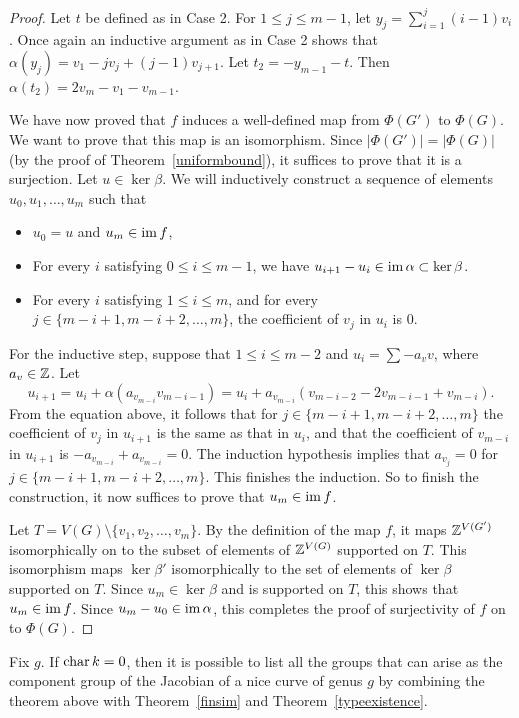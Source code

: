 \begin{proof}
Let $t$ be defined as in Case 2. For $1 \leq j \leq m-1$, let $y_j = \sum_{i=1}^j (i-1)v_i$. Once again an inductive argument as in Case 2 shows that $\alpha(y_j) = v_1-jv_j+(j-1)v_{j+1}$. Let $t_2 = -y_{m-1}-t$. Then $\alpha(t_2) = 2v_m-v_1-v_{m-1}$.

We have now proved that $f$ induces a well-defined map from $\Phi(G')$ to $\Phi(G)$. We want to prove that this map is an isomorphism. Since $|\Phi(G')| = |\Phi(G)|$ (by the proof of Theorem~\ref{uniformbound}), it suffices to prove that it is a surjection. Let $u \in \ker \beta$. We will inductively construct a sequence of elements $u_0,u_1,\ldots,u_m$ such that 
 \begin{itemize}
  \item $u_0 = u$ and $u_m \in \operatorname{im} f$,
  \item For every $i$ satisfying $0 \leq i \leq m-1$, we have $u_{i+1}-u_i \in \operatorname{im} \alpha \subset \ker \beta$. 
  \item For every $i$ satisfying $1 \leq i \leq m$, and for every $j \in \{{m-i+1},{m-i+2},\ldots,m\}$, the coefficient of $v_j$ in $u_i$ is $0$.  
 \end{itemize}
 For the inductive step, suppose that $1 \leq i \leq m-2$ and $u_i = \sum -a_v v$, where $a_v \in \mathbb Z$. Let 
 \[ u_{i+1} = u_i + \alpha(a_{v_{m-i}} v_{m-i-1}) = u_i+a_{v_{m-i}}(v_{m-i-2}-2v_{m-i-1}+v_{m-i}) .\] 
 From the equation above, it follows that for $j \in \{m-i+1,m-i+2,\ldots,m \}$ the coefficient of $v_j$ in $u_{i+1}$ is the same as that in $u_i$, and that the coefficient of $v_{m-i}$ in $u_{i+1}$ is $-a_{v_{m-i}}+a_{v_{m-i}} = 0$. The induction hypothesis implies that $a_{v_j} = 0$ for $j \in \{m-i+1,m-i+2,\ldots,m\}$. This finishes the induction. So to finish the construction, it now suffices to prove that $u_m \in \operatorname{im} f$. 
 
 Let $T = V(G) \setminus \{v_1,v_2,\ldots,v_m\}$. By the definition of the map $f$, it maps $\mathbb Z^{V(G')}$ isomorphically on to the subset of elements of $\mathbb Z^{V(G)}$ supported on $T$. This isomorphism maps $\ker \beta'$ isomorphically to the set of elements of $\ker \beta$ supported on $T$. Since $u_m \in \ker \beta$ and is supported on $T$, this shows that $u_m \in \operatorname{im} f$.  Since $u_m-u_0 \in \operatorname{im} \alpha$, this completes the proof of surjectivity of $f$ on to $\Phi(G)$.   
\end{proof}

\begin{rmk}
 Fix $g$. If $\operatorname{char} k = 0$, then it is possible to list all the groups that can arise as the component group of the Jacobian of a nice curve of genus $g$ by combining the theorem above with Theorem~\ref{finsim} and Theorem~\ref{typeexistence}.
\end{rmk}

